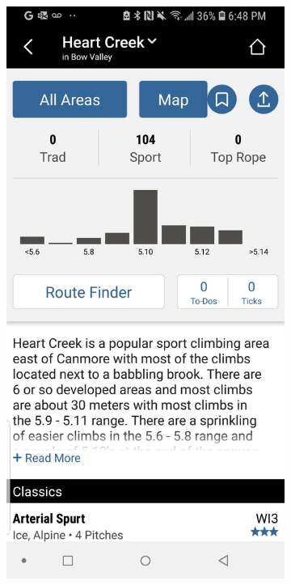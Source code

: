\documentclass[10pt]{article}
\begin{document}
\begin{figure}[!h]
  \centering
  \begin{subfigure}[b]{0.3\textwidth}
      \centering
      \includegraphics[width=\textwidth]{mp_heart_creek.jpg}

\end{subfigure}
\end{figure}
\end{document}

